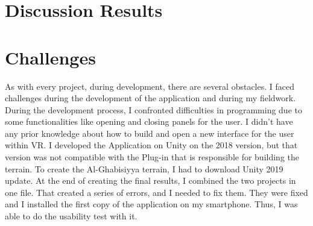 

\section{Discussion Results}




\section{Challenges}

As with every project, during development, there are several obstacles. I faced challenges during the development of the application and during my fieldwork. During the development process, I confronted difficulties in programming due to some functionalities like opening and closing panels for the user. I didn't have any prior knowledge about how to build and open a new interface for the user within VR. I developed the Application on Unity on the 2018 version, but that version was not compatible with the Plug-in that is responsible for building the terrain. To create the Al-Ghabisiyya terrain, I had to download Unity 2019 update. At the end of creating the final results, I combined the two projects in one file. That created a series of errors, and I needed to fix them. They were fixed and I installed the first copy of the application on my smartphone. Thus, I was able to do the usability test with it. 
